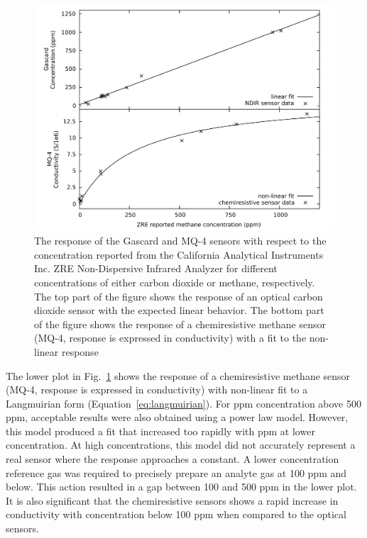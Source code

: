 \documentclass[sensors,article,submit,moreauthors,pdftex]{Definitions/mdpi}
\begin{document}
			\begin{figure}[!t]
				\centering
				\includegraphics[width=0.9\columnwidth]{honey9.pdf}
				\caption{The response of the Gascard and MQ-4 sensors with respect to the concentration reported from the California Analytical Instruments Inc. ZRE Non-Dispersive Infrared Analyzer for different concentrations of either carbon dioxide or methane, respectively.
					The top part of the figure shows the response of an optical carbon dioxide sensor with the expected linear behavior.
					The bottom part of the figure shows the response of a chemiresistive methane sensor (MQ-4, response is expressed in conductivity) with a fit to the non-linear response}
				\label{fig:gascardcodiff}
			\end{figure}
			
			The lower plot in Fig.~\ref{fig:gascardcodiff} shows the response of a chemiresistive methane sensor (MQ-4, response is expressed in conductivity) with non-linear fit to a  Langmuirian form  (Equation~\ref{eq:langmuirian}).
			For ppm concentration above 500 ppm, acceptable results were also obtained using a power law model. However, this model produced a fit that increased too rapidly with ppm at lower concentration.
			At high concentrations, this model did not accurately represent a real sensor where the response approaches a constant.
			A lower concentration reference gas was required to precisely prepare an analyte gas at 100 ppm and below.
			This action resulted in a gap between 100 and 500 ppm in the lower plot.
			It is also significant that the chemiresistive sensors shows a rapid increase in conductivity with concentration below 100 ppm when compared to the optical sensors.
			
\end{document}
